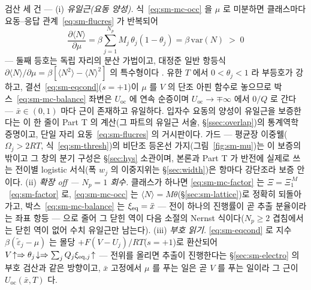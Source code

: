 \begin{verifybox}
검산 세 건 --- (i) \emph{유일근(요동 양성).} 식~\eqref{eq:sm-mc-occ} 을 $\mu$ 로 미분하면 클래스마다
요동--응답 관계~\eqref{eq:sm-flucres} 가 반복되어
\begin{equation}
\frac{\partial\langle N\rangle}{\partial\mu}
=\beta\sum_{j=1}^{N_p}M_j\,\theta_j(1-\theta_j)
=\beta\,\mathrm{var}(N)\;>\;0
\label{eq:sm-mc-fluc}
\end{equation}
--- 둘째 등호는 독립 자리의 분산 가법이고, 대정준 일반 항등식
$\partial\langle N\rangle/\partial\mu=\beta[\langle N^2\rangle-\langle N\rangle^2]$ 의 특수형이다
\cite{mcquarrie1976}. 유한 $T$ 에서 $0<\theta_j<1$ 라 부등호가 강하고, 결선~\eqref{eq:sm-eqcond}($s{=}+1$)이
$\mu$ 를 $V$ 의 단조 아핀 함수로 놓으므로 박스~\eqref{eq:sm-mc-balance} 좌변은 $U_\mathrm{oc}$ 에 연속
순증이며 $U_\mathrm{oc}\to\mp\infty$ 에서 $0/Q$ 로 간다 --- $\bar x\in(0,1)$ 마다 근이 존재하고 유일하다.
입자수 요동의 양성이 유일근을 보증한다는 이 한 줄이 Part T 의 계산(그 파트의 유일근 서술, \S\ref{ssec:overlap})의 통계역학
증명이고, 단일 자리 요동~\eqref{eq:sm-flucres} 의 거시판이다. 가드 --- 평균장 이중웰($\Omega_j>2RT$,
식~\eqref{eq:sm-thresh})의 비단조 등온선 가지(그림~\ref{fig:sm-mu})는 이 보증의 밖이고 그 창의 분기 구성은
\S\ref{sec:hys} 소관이며, 본론과 Part T 가 반전에 실제로 쓰는 전이별 logistic 서식(폭 $w_j$ 의 이중지위는
\S\ref{sec:width})은 항마다 강단조라 보증 안이다. (ii) \emph{확장 off --- $N_p=1$ 회수.} 클래스가 하나면
\eqref{eq:sm-mc-factor} 는 $\Xi=\Xi_1^{\,M}$~\eqref{eq:sm-factor} 로, \eqref{eq:sm-mc-occ} 는
$\langle N\rangle=M\theta$(\S\ref{sec:sm-lattice})로 정확히 되돌아가고, 박스~\eqref{eq:sm-mc-balance} 는
$\xi_{\mathrm{eq}}=\bar x$ --- 전이 하나의 진행률이 곧 추출 분율이라는 좌표 항등 --- 으로 줄어 그 닫힌 역이 다음 소절의
Nernst 식이다($N_p\ge2$ 겹침에서는 닫힌 역이 없어 수치 유일근만 남는다). (iii) \emph{부호 읽기.}
\eqref{eq:sm-eqcond} 로 지수 $\beta(\tilde\varepsilon_j-\mu)$ 는 몰당 $+F(V-U_j)/RT$($s{=}+1$)로 환산되어
$V\!\uparrow\Rightarrow\theta_j\!\downarrow\Rightarrow\sum_jQ_j\xi_{\mathrm{eq},j}\!\uparrow$ --- 전위를 올리면 추출이
진행한다는 \S\ref{sec:sm-electro} 의 부호 검산과 같은 방향이고, $\bar x$ 고정에서 $\mu$ 를 푸는 일은 곧 $V$
를 푸는 일이라 그 근이 $U_\mathrm{oc}(\bar x,T)$ 다.
\end{verifybox}

